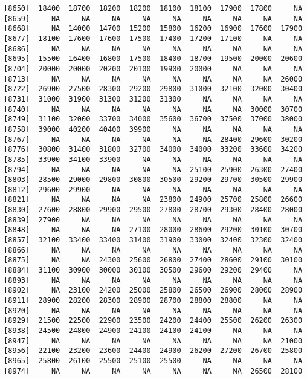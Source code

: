 \documentclass[]{article}
\begin{document}
\begin{verbatim}
 [8650]  18400  18700  18200  18200  18100  18100  17900  17800     NA
 [8659]     NA     NA     NA     NA     NA     NA     NA     NA     NA
 [8668]     NA  14000  14700  15200  15800  16200  16900  17600  17900
 [8677]  18100  17600  17600  17500  17400  17200  17100     NA     NA
 [8686]     NA     NA     NA     NA     NA     NA     NA     NA     NA
 [8695]  15500  16400  16800  17500  18400  18700  19500  20000  20600
 [8704]  20000  20000  20200  20100  19900  20000     NA     NA     NA
 [8713]     NA     NA     NA     NA     NA     NA     NA     NA  26000
 [8722]  26900  27500  28300  29200  29800  31000  32100  32000  30400
 [8731]  31000  31900  31300  31200  31300     NA     NA     NA     NA
 [8740]     NA     NA     NA     NA     NA     NA     NA  30000  30700
 [8749]  31100  32000  33700  34000  35600  36700  37500  37000  38000
 [8758]  39000  40200  40400  39900     NA     NA     NA     NA     NA
 [8767]     NA     NA     NA     NA     NA     NA  28400  29600  30200
 [8776]  30800  31400  31800  32700  34000  34000  33200  33600  34200
 [8785]  33900  34100  33900     NA     NA     NA     NA     NA     NA
 [8794]     NA     NA     NA     NA     NA  25100  25900  26300  27400
 [8803]  28500  29000  29800  30800  30500  29200  29700  30500  29900
 [8812]  29600  29900     NA     NA     NA     NA     NA     NA     NA
 [8821]     NA     NA     NA     NA  23800  24900  25700  25800  26600
 [8830]  27600  28800  29900  29500  27800  28700  29300  28400  28000
 [8839]  27900     NA     NA     NA     NA     NA     NA     NA     NA
 [8848]     NA     NA     NA  27100  28000  28600  29200  30100  30700
 [8857]  32100  33400  33400  31400  31900  33000  32400  32300  32400
 [8866]     NA     NA     NA     NA     NA     NA     NA     NA     NA
 [8875]     NA     NA  24300  25600  26800  27400  28600  29100  30100
 [8884]  31100  30900  30000  30100  30500  29600  29200  29400     NA
 [8893]     NA     NA     NA     NA     NA     NA     NA     NA     NA
 [8902]     NA  23100  24200  25000  25800  26500  26900  28000  28900
 [8911]  28900  28200  28300  28900  28700  28800  28800     NA     NA
 [8920]     NA     NA     NA     NA     NA     NA     NA     NA     NA
 [8929]  21500  22500  22900  23500  24200  24400  25500  26200  26300
 [8938]  24500  24800  24900  24100  24100  24100     NA     NA     NA
 [8947]     NA     NA     NA     NA     NA     NA     NA     NA  21000
 [8956]  22100  23200  23600  24400  24900  26200  27200  26700  25800
 [8965]  25800  26100  25500  25100  25500     NA     NA     NA     NA
 [8974]     NA     NA     NA     NA     NA     NA     NA  26500  28100

\end{verbatim}
\end{document}
